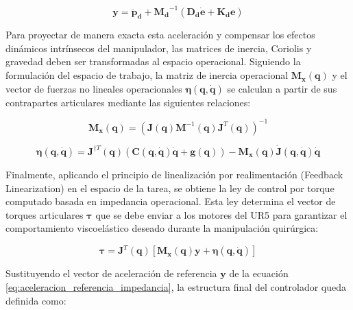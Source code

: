 \begin{equation}
    \boldsymbol{y} = \boldsymbol{\ddot{p}_d} + \boldsymbol{M_d}^{-1} \left( \boldsymbol{D_d} \boldsymbol{\dot{e}} + \boldsymbol{K_d} \boldsymbol{e} \right)
    \label{eq:aceleracion_referencia_impedancia}
\end{equation}

Para proyectar de manera exacta esta aceleración y compensar los efectos
dinámicos intrínsecos del manipulador, las matrices de inercia, Coriolis y
gravedad deben ser transformadas al espacio operacional. Siguiendo la
formulación del espacio de trabajo, la matriz de inercia operacional
$\boldsymbol{M_x}(\boldsymbol{q})$ y el vector de fuerzas no lineales operacionales $\boldsymbol{\eta}(\boldsymbol{q},
    \boldsymbol{\dot{q}})$ se calculan a partir de sus contrapartes articulares mediante las
siguientes relaciones:

\begin{equation}
    \boldsymbol{M_x}(\boldsymbol{q}) = \left( \boldsymbol{J}(\boldsymbol{q}) \boldsymbol{M}^{-1}(\boldsymbol{q}) \boldsymbol{J}^T(\boldsymbol{q}) \right)^{-1}
\end{equation}

\begin{equation}
    \boldsymbol{\eta}(\boldsymbol{q}, \boldsymbol{\dot{q}}) = \boldsymbol{J}^{\dagger T}(\boldsymbol{q}) \left( \boldsymbol{C}(\boldsymbol{q}, \boldsymbol{\dot{q}})\boldsymbol{\dot{q}} + \boldsymbol{g}(\boldsymbol{q}) \right)
    - \boldsymbol{M_x}(\boldsymbol{q}) \boldsymbol{\dot{J}}(\boldsymbol{q}, \boldsymbol{\dot{q}}) \boldsymbol{\dot{q}}
\end{equation}

Finalmente, aplicando el principio de linealización por realimentación
(Feedback Linearization) en el espacio de la tarea, se obtiene la ley de
control por torque computado basada en impedancia operacional. Esta ley
determina el vector de torques articulares $\boldsymbol{\tau}$ que se debe enviar a los
motores del UR5 para garantizar el comportamiento viscoelástico deseado durante
la manipulación quirúrgica:

\begin{equation}
    \boldsymbol{\tau} = \boldsymbol{J}^T(\boldsymbol{q}) \left[ \boldsymbol{M_x}(\boldsymbol{q}) \boldsymbol{y} + \boldsymbol{\eta}(\boldsymbol{q}, \boldsymbol{\dot{q}}) \right]
\end{equation}

Sustituyendo el vector de aceleración de referencia $\boldsymbol{y}$ de la ecuación
\ref{eq:aceleracion_referencia_impedancia}, la estructura final del
controlador queda definida como:

